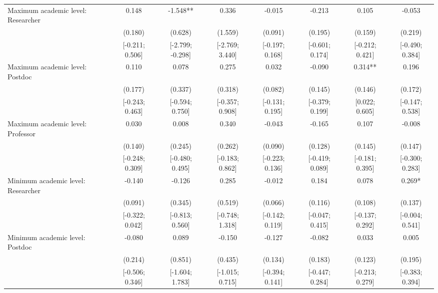 \begin{tabular}{l*{7}{c}}
Maximum academic level: Researcher&       0.148   &      -1.548** &       0.336   &      -0.015   &      -0.213   &       0.105   &      -0.053   \\
                    &     (0.180)   &     (0.628)   &     (1.559)   &     (0.091)   &     (0.195)   &     (0.159)   &     (0.219)   \\
                    &[-0.211; 0.506]   &[-2.799; -0.298]   &[-2.769; 3.440]   &[-0.197; 0.168]   &[-0.601; 0.174]   &[-0.212; 0.421]   &[-0.490; 0.384]   \\
Maximum academic level: Postdoc&       0.110   &       0.078   &       0.275   &       0.032   &      -0.090   &       0.314** &       0.196   \\
                    &     (0.177)   &     (0.337)   &     (0.318)   &     (0.082)   &     (0.145)   &     (0.146)   &     (0.172)   \\
                    &[-0.243; 0.463]   &[-0.594; 0.750]   &[-0.357; 0.908]   &[-0.131; 0.195]   &[-0.379; 0.199]   &[0.022; 0.605]   &[-0.147; 0.538]   \\
Maximum academic level: Professor&       0.030   &       0.008   &       0.340   &      -0.043   &      -0.165   &       0.107   &      -0.008   \\
                    &     (0.140)   &     (0.245)   &     (0.262)   &     (0.090)   &     (0.128)   &     (0.145)   &     (0.147)   \\
                    &[-0.248; 0.309]   &[-0.480; 0.495]   &[-0.183; 0.862]   &[-0.223; 0.136]   &[-0.419; 0.089]   &[-0.181; 0.395]   &[-0.300; 0.283]   \\
Minimum academic level: Researcher&      -0.140   &      -0.126   &       0.285   &      -0.012   &       0.184   &       0.078   &       0.269*  \\
                    &     (0.091)   &     (0.345)   &     (0.519)   &     (0.066)   &     (0.116)   &     (0.108)   &     (0.137)   \\
                    &[-0.322; 0.042]   &[-0.813; 0.560]   &[-0.748; 1.318]   &[-0.142; 0.119]   &[-0.047; 0.415]   &[-0.137; 0.292]   &[-0.004; 0.541]   \\
Minimum academic level: Postdoc&      -0.080   &       0.089   &      -0.150   &      -0.127   &      -0.082   &       0.033   &       0.005   \\
                    &     (0.214)   &     (0.851)   &     (0.435)   &     (0.134)   &     (0.183)   &     (0.123)   &     (0.195)   \\
                    &[-0.506; 0.346]   &[-1.604; 1.783]   &[-1.015; 0.715]   &[-0.394; 0.141]   &[-0.447; 0.284]   &[-0.213; 0.279]   &[-0.383; 0.394]   \\

\end{tabular}
